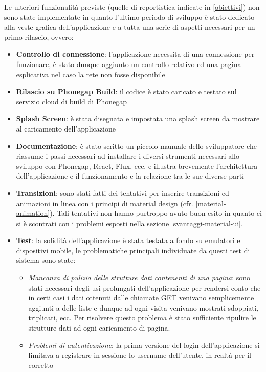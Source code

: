Le ulteriori funzionalità previste (quelle di reportistica indicate in \ref{obiettivi})
non sono state implementate in quanto l'ultimo periodo di sviluppo è stato dedicato
alla veste grafica dell'applicazione e a tutta una serie di aspetti necessari per un
primo rilascio, ovvero:

\begin{itemize}
\item \textbf{Controllo di connessione}: l'applicazione necessita di una connessione
per funzionare, è stato dunque aggiunto un controllo relativo ed una pagina esplicativa
nel caso la rete non fosse disponibile
\item \textbf{Rilascio su Phonegap Build}: il codice è stato caricato e testato sul servizio
cloud di build di Phonegap
\item \textbf{Splash Screen}: è stata disegnata e impostata una splash screen da mostrare
al caricamento dell'applicazione
\item \textbf{Documentazione}: è stato scritto un piccolo manuale dello sviluppatore che
riassume i passi necessari ad installare i diversi strumenti necessari allo sviluppo con
Phonegap, React, Flux, ecc. e illustra brevemente l'architettura dell'applicazione e
il funzionamento e la relazione tra le sue diverse parti
\item \textbf{Transizioni}: sono stati fatti dei tentativi per inserire transizioni ed
animazioni in linea con i principi di material design (cfr. \ref{material-animation}).
Tali tentativi non hanno purtroppo avuto buon esito in quanto ci si è scontrati con
i problemi esposti nella sezione \ref{svantaggi-material-ui}.
\item \textbf{Test}: la solidità dell'applicazione è stata testata a fondo su emulatori
e dispositivi mobile, le problematiche principali individuate da questi test di sistema
sono state:
	\begin{itemize}
	\item \textit{Mancanza di pulizia delle strutture dati contenenti di una pagina}:
	sono stati necessari degli usi prolungati dell'applicazione per rendersi conto che in
	certi casi i dati ottenuti dalle chiamate GET venivano semplicemente aggiunti a delle
	liste e dunque ad ogni visita venivano mostrati sdoppiati, triplicati,
	ecc. Per risolvere questo problema è stato sufficiente ripulire le strutture dati ad ogni
	caricamento di pagina.
	\item \textit{Problemi di autenticazione}: la prima versione del login dell'applicazione
	si limitava a registrare in sessione lo username dell'utente, in realtà per il corretto

\end{itemize}
\end{itemize}
